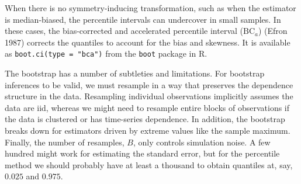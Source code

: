 \documentclass[
  13pt,
  letterpaper,
  DIV=11,
  numbers=noendperiod]{scrreprt}
\theoremstyle{plain}
\theoremstyle{plain}
\theoremstyle{definition}
\theoremstyle{definition}
\theoremstyle{remark}
\begin{document}
When there is no symmetry-inducing transformation, such as when the
estimator is median-biased, the percentile intervals can undercover in
small samples. In these cases, the bias-corrected and accelerated
percentile interval (\(\text{BC}_a\)) (Efron 1987) corrects the
quantiles to account for the bias and skewness. It is available as
\texttt{boot.ci(type\ =\ "bca")} from the \texttt{boot} package in R.

The bootstrap has a number of subtleties and limitations. For bootstrap
inferences to be valid, we must resample in a way that preserves the
dependence structure in the data. Resampling individual observations
implicitly assumes the data are iid, whereas we might need to resample
entire blocks of observations if the data is clustered or has
time-series dependence. In addition, the bootstrap breaks down for
estimators driven by extreme values like the sample maximum. Finally,
the number of resamples, \(B\), only controls simulation noise. A few
hundred might work for estimating the standard error, but for the
percentile method we should probably have at least a thousand to obtain
quantiles at, say, \(0.025\) and \(0.975\).
\end{document}
